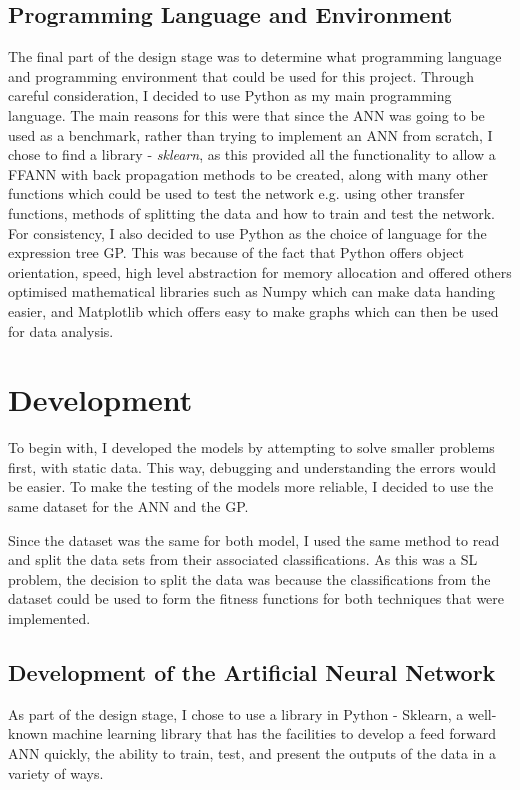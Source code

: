 \documentclass[11pt]{article}
\begin{document}
\subsection{Programming Language and Environment}\label{subsec:PLE}
The final part of the design stage was to determine what programming language and programming environment that could be used for this project. Through careful consideration, I decided to use Python as my main programming language. The main reasons for this were that since the ANN was going to be used as a benchmark, rather than trying to implement an ANN from scratch, I chose to find a library - \textit{sklearn}, as this provided all the functionality to allow a FFANN with back propagation methods to be created, along with many other functions which could be used to test the network e.g. using other transfer functions, methods of splitting the data and how to train and test the network. For consistency, I also decided to use Python as the choice of language for the expression tree GP. This was because of the fact that Python offers object orientation, speed, high level abstraction for memory allocation and offered others optimised mathematical libraries such as Numpy which can make data handing easier, and Matplotlib which offers easy to make graphs which can then be used for data analysis. 
\section{Development}\label{subsubsec:DEV}
To begin with, I developed the models by attempting to solve smaller problems first, with static data. This way, debugging and understanding the errors would be easier. To make the testing of the models more reliable, I decided to use the same dataset for the ANN and the GP. 

Since the dataset was the same for both model, I used the same method to read and split the data sets from their associated classifications. As this was a SL problem, the decision to split the data was because the classifications from the dataset could be used to form the fitness functions for both techniques that were implemented.
\subsection{Development of the Artificial Neural Network}\label{subsec:devANN}
As part of the design stage, I chose to use a library in Python - Sklearn, a well-known machine learning library that has the facilities to develop a feed forward ANN quickly, the ability to train, test, and present the outputs of the data in a variety of ways. 
\end{document}
